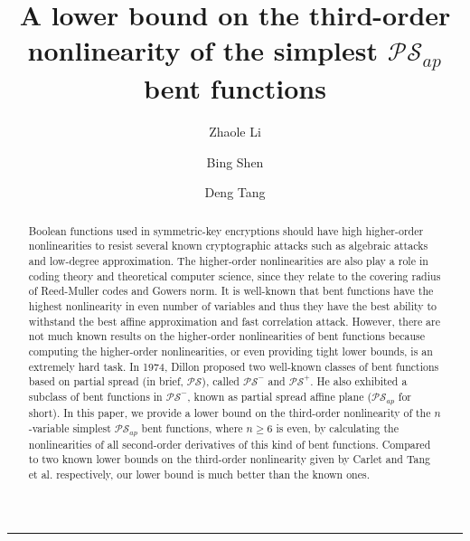 \documentclass{article}
\title{A lower bound on the third-order nonlinearity of the simplest $\mathcal{PS}_{ap}$ bent functions}
\author[a]{Zhaole Li}
\author[b]{Bing Shen}
\author[a,b]{Deng Tang}
\affil[a]{School of Electronic Information and Electrical Engineering, Shanghai Jiao Tong University, Shanghai 200240, China}
\affil[b]{Science and Technology on Communication Security Laboratory, Chengdu 610041, Sichuan, China}
\newcommand{\0}{\textbf{0}}
\newcommand{\1}{\textbf{1}}
\theoremstyle{plain}
\begin{document}
 \maketitle
  \noindent
  \rule{\linewidth}{0.4pt}

\begin{abstract}
Boolean functions used in symmetric-key encryptions should have high higher-order nonlinearities to resist several known cryptographic attacks
such as algebraic attacks and low-degree approximation.
The higher-order nonlinearities are also play a role in coding theory and theoretical computer science, since they relate to the covering radius of Reed-Muller codes 
and Gowers norm. It is well-known that bent functions have the highest nonlinearity in even number of variables and thus they have 
the best ability to withstand the best affine approximation and fast correlation attack.
However,  there are not much known results on the higher-order nonlinearities of bent functions 
because computing the higher-order nonlinearities, or even providing tight lower bounds, is an extremely hard task. 
In 1974, Dillon proposed two well-known classes of bent functions based on partial spread (in brief, $\mathcal{PS}$), called 
$\mathcal{PS}^-$ and $\mathcal{PS}^+$. He also exhibited a subclass of bent functions in $\mathcal{PS}^-$, known as  
partial spread affine plane ($\mathcal{PS}_{ap}$ for short).
In this paper, we provide a lower bound on the third-order nonlinearity of the $n$-variable simplest $\mathcal{PS}_{ap}$ bent functions, where $n\ge 6$ is even, by calculating the nonlinearities of all second-order derivatives of this kind of bent functions.
Compared to two known lower bounds on the third-order nonlinearity given by Carlet and Tang et al. respectively, 
our lower bound is much better than the known ones.
\end{abstract}
\end{document}
